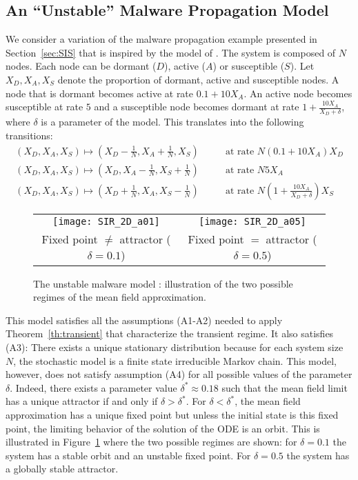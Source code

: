\documentclass[sigconf]{acmart}
\begin{document}
\subsection{An ``Unstable'' Malware Propagation Model}
\label{ssec:unstableSIR} 
We consider a variation of the malware propagation example presented
in Section~\ref{sec:SIS} that is inspired by the model of
\cite{benaim2008class}. The system is composed of $N$ nodes. Each node
can be dormant ($D$), active ($A$) or susceptible ($S$). Let
$X_D,X_A,X_S$ denote the proportion of dormant, active and susceptible
nodes. A node that is dormant becomes active at rate $0.1+10 X_A$. An
active node becomes susceptible at rate $5$ and a susceptible node
becomes dormant at rate $1+\frac{10X_A}{X_D+\delta}$, where $\delta$
is a parameter of the model. This translates into the following
transitions: 
\begin{align*}
  (X_D,X_A,X_S) \mapsto (X_D-\frac1N,X_A+\frac1N,X_S) &&& \text{ at rate $N(0.1+10X_A)X_D$}\\
  (X_D,X_A,X_S) \mapsto (X_D,X_A-\frac1N,X_S+\frac1N) &&& \text{ at rate $N5X_A$}\\
  (X_D,X_A,X_S) \mapsto (X_D+\frac1N,X_A,X_S-\frac1N) &&& \text{ at
                                                          rate
                                                          $N(1+\frac{10X_A}{X_D+\delta})X_S$}
\end{align*}


\begin{figure}[t]
  \centering
  \begin{tabular}{@{}cc@{}}
    \texttt{[image: SIR\_2D\_a01]}
    &\texttt{[image: SIR\_2D\_a05]}\\
    Fixed point $\ne$ attractor ($\delta=0.1$)
    & Fixed point $=$ attractor ($\delta=0.5$)
  \end{tabular}
  \caption{The unstable malware model : illustration of the two
    possible regimes of the mean field approximation.}
  \label{fig:unstableSIR_limit}
\end{figure}

This model satisfies all the assumptions (A1-A2) needed to apply
Theorem~\ref{th:transient} that characterize the transient regime. It
also satisfies (A3): There exists a unique stationary distribution
because for each system size $N$, the stochastic model is a finite
state irreducible Markov chain. This model, however, does not satisfy
assumption (A4) for all possible values of the parameter $\delta$.
Indeed, there exists a parameter value $\delta^*\approx0.18$ such that
the mean field limit has a unique attractor if and only if
$\delta>\delta^*$. For $\delta<\delta^*$, the mean field approximation
has a unique fixed point but unless the initial state is this fixed
point, the limiting behavior of the solution of the ODE is an
orbit. This is illustrated in Figure~\ref{fig:unstableSIR_limit} where
the two possible regimes are shown: for $\delta=0.1$ the system has a
stable orbit and an unstable fixed point. For $\delta=0.5$ the system
has a globally stable attractor.
\end{document}
